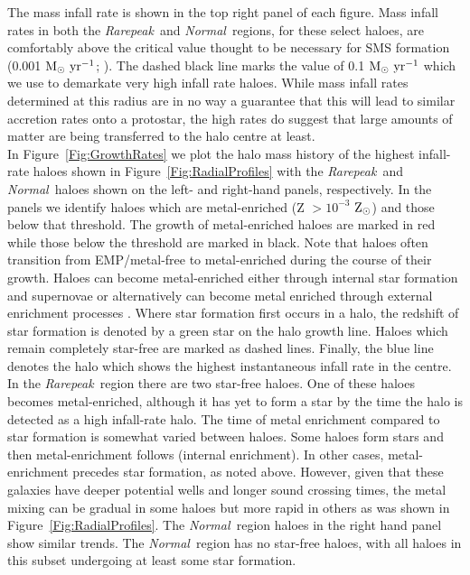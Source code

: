 \documentclass[twocolumn,iop,revtex4]{openjournal}
\newcommand{\msolaryr} {$\rm{M_{\odot}~yr^{-1}}~$}
\newcommand{\msolaryrc} {$\rm{M_{\odot}~yr^{-1}}$}
\newcommand{\zsolarc} {$\rm{Z_{\odot}}$}
\newcommand{\rarepeak} {\textit{Rarepeak~}}
\newcommand{\normal} {\textit{Normal~}}
\begin{document}
\indent The mass infall rate is shown in the top right panel of each figure. 
Mass infall rates in both the \rarepeak and \normal regions, for these select haloes, are
comfortably above the critical value thought to be necessary for SMS formation (0.001
\msolaryrc; \citealt{Haemmerle_2018}). The dashed black line marks the value of 0.1 \msolaryr which we use to demarkate very high infall rate haloes.
While mass infall rates determined at this radius are in no
way a guarantee that this will lead to similar accretion rates onto a protostar, the high rates do
suggest that large amounts of matter are being transferred to the halo centre at least. \\
\indent In Figure~\ref{Fig:GrowthRates} we plot the halo mass history of the highest
infall-rate haloes shown in Figure~\ref{Fig:RadialProfiles} with the \rarepeak and \normal haloes
shown on the left- and right-hand panels, respectively. In the panels we identify haloes which
are metal-enriched (Z $> 10^{-3}$ \zsolarc) and those below that threshold. The growth of
metal-enriched haloes are marked in red while those below the threshold are marked in black. Note
that haloes often transition from EMP/metal-free to metal-enriched during the course of their growth. 
Haloes can become metal-enriched either through internal star formation and
supernovae or alternatively can become metal enriched through external enrichment processes
\citep[e.g.,][]{Smith_2015}. Where star formation first
occurs in a halo, the redshift of star formation is denoted by a green star on the halo growth line. 
Haloes which remain completely star-free are marked as dashed lines. Finally, the blue line denotes
the halo which shows the highest instantaneous infall rate in the centre. \\
\indent In the \rarepeak region there are two
star-free haloes. One of these haloes becomes metal-enriched, although it has yet to form
a star by the time the halo is detected as a high infall-rate halo. The time of metal enrichment
compared to star formation is somewhat varied between haloes. Some haloes form stars and then
metal-enrichment follows (internal enrichment). In other cases, metal-enrichment precedes
star formation, as noted above.
However, given that these galaxies have deeper potential wells and longer sound crossing times,
the metal mixing can be gradual in some haloes but more rapid in others as was shown in Figure~\ref{Fig:RadialProfiles}.
The \normal region haloes in the right hand panel show similar trends.
The \normal region has no star-free haloes, with all haloes in this subset undergoing at
least some star formation.
\end{document}
